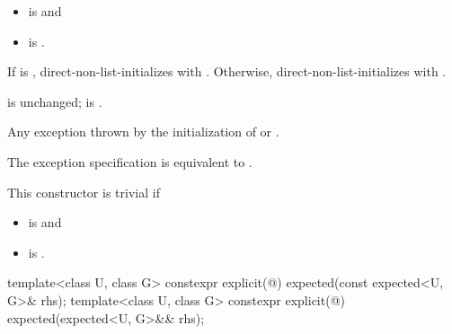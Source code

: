 \begin{itemdescr}
\pnum
\constraints
\begin{itemize}
\item
{} is  and
\item
{} is .
\end{itemize}

\pnum
\effects
If  is ,
direct-non-list-initializes  with .
Otherwise,
direct-non-list-initializes  with .

\pnum
\ensures
{} is unchanged;
 is .

\pnum
\throws
Any exception thrown by the initialization of  or .

\pnum
\remarks
The exception specification is equivalent to
.

\pnum
This constructor is trivial if
\begin{itemize}
\item
{} is  and
\item
{} is .
\end{itemize}
\end{itemdescr}

%
\begin{itemdecl}
template<class U, class G>
  constexpr explicit(@\seebelow@) expected(const expected<U, G>& rhs);
template<class U, class G>
  constexpr explicit(@\seebelow@) expected(expected<U, G>&& rhs);
\end{itemdecl}

